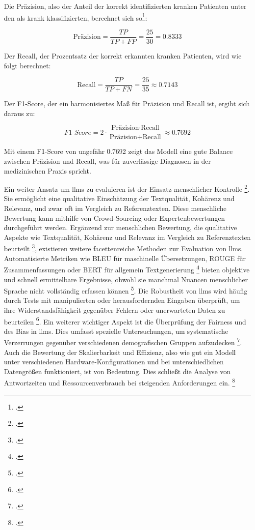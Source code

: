 Die Präzision, also der Anteil der korrekt identifizierten kranken Patienten unter den als krank klassifizierten, berechnet sich so\footcite[Vgl.][S. 262 f.]{derczynski-2016-complementarity}:

\begin{equation}
    \text{Präzision} = \frac{TP}{TP + FP} = \frac{25}{30} = 0.8333
\end{equation}

Der Recall, der Prozentsatz der korrekt erkannten kranken Patienten, wird wie folgt berechnet:

\begin{equation}
    \text{Recall} = \frac{TP}{TP + FN} = \frac{25}{35} \approx 0.7143
\end{equation}

Der F1-Score, der ein harmonisiertes Maß für Präzision und Recall ist, ergibt sich daraus zu:

\begin{equation}
    F1\text{-}Score = 2 \cdot \frac{\text{Präzision} \cdot \text{Recall}}{\text{Präzision} + \text{Recall}} \approx 0.7692
\end{equation}

Mit einem F1-Score von ungefähr 0.7692 zeigt das Modell eine gute Balance zwischen Präzision und Recall, was für zuverlässige Diagnosen in der medizinischen Praxis spricht.

Ein weiter Ansatz um \acp{llm} zu evaluieren ist der Einsatz menschlicher Kontrolle \footcite[Vgl.][S. 1]{chiang2023large}.
Sie ermöglicht eine qualitative Einschätzung der Textqualität, Kohärenz und Relevanz, und zwar oft im Vergleich zu Referenztexten.
Diese menschliche Bewertung kann mithilfe von Crowd-Sourcing oder Expertenbewertungen durchgeführt werden.
Ergänzend zur menschlichen Bewertung, die qualitative Aspekte wie Textqualität, Kohärenz und Relevanz im Vergleich zu Referenztexten beurteilt \footcite[Vgl.][S. 73]{liang2023holistic}, existieren weitere facettenreiche Methoden zur Evaluation von \acp{llm}.
Automatisierte Metriken wie BLEU für maschinelle Übersetzungen, ROUGE für Zusammenfassungen oder BERT für allgemein Textgenerierung \footcite[Vgl.][S. 1]{zhang2020bertscore} bieten objektive und schnell ermittelbare Ergebnisse, obwohl sie manchmal Nuancen menschlicher Sprache nicht vollständig erfassen können \footcite[Vgl.][S. 27 f.]{chang2023survey}. Die Robustheit von \acp{llm} wird häufig durch Tests mit manipulierten oder herausfordernden Eingaben überprüft, um ihre Widerstandsfähigkeit gegenüber Fehlern oder unerwarteten Daten zu beurteilen \footcite[Vgl.][S. 29 f.]{liang2023holistic}.
Ein weiterer wichtiger Aspekt ist die Überprüfung der Fairness und des Bias in \acp{llm}.
Dies umfasst spezielle Untersuchungen, um systematische Verzerrungen gegenüber verschiedenen demografischen Gruppen aufzudecken \footcite[Vgl.][S. 30 f.]{liang2023holistic}.
Auch die Bewertung der Skalierbarkeit und Effizienz, also wie gut ein Modell unter verschiedenen Hardware-Konfigurationen und bei unterschiedlichen Datengrößen funktioniert, ist von Bedeutung.
Dies schließt die Analyse von Antwortzeiten und Ressourcenverbrauch bei steigenden Anforderungen ein. \footcite[Vgl.][S. 33]{liang2023holistic}

